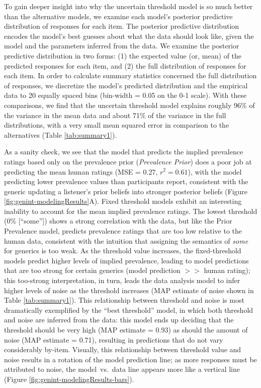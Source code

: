 \documentclass[floatsintext,doc]{apa6}
\begin{document}
To gain deeper insight into why the uncertain threshold model is so much better than the alternative models, we examine each model's posterior predictive distribution of responses for each item. The posterior predictive distribution encodes the model's best guesses about what the data should look like, given the model and the parameters inferred from the data. 
We examine the posterior predictive distribution in two forms: (1) the expected value (or, mean) of the predicted responses for each item, and (2) the full distribution of responses for each item. In order to calculate summary statistics concerned the full distribution of responses, we discretize the model's predicted distribution and the empirical data to 20 equally spaced bins (bin-width = 0.05 on the 0-1 scale). 
With these comparisons, we find that the uncertain threshold model explains roughly 96\% of the variance in the mean data and about 71\% of the variance in the full distributions, with a very small mean squared error in comparison to the alternatives (Table \ref{tab:summary1}). 

As a sanity check, we see that the model that predicts the implied prevalence ratings based only on the prevalence prior (\emph{Prevalence Prior}) does a poor job at predicting the mean human ratings (MSE = 0.27, $r^2 = 0.61$), with the model predicting lower prevalence values than participants report, consistent with the generic updating a listener's prior beliefs into stronger posterior beliefs (Figure \ref{fig:genint-modelingResults}A). 
Fixed threshold models exhibit an interesting inability to account for the mean implied prevalence ratings. The lowest threshold (0\% [``some'']) shows a strong correlation with the data, but like the Prior Prevalence model, predicts prevalence ratings that are too low relative to the human data, consistent with the intuition that assigning the semantics of \emph{some} for generics is too weak.
As the threshold value increases, the fixed-threshold models predict higher levels of implied prevalence, leading to model predictions that are too strong for certain generics (model prediction $>>$ human rating); this too-strong interpretation, in turn, leads the data analysis model to infer higher levels of noise as the threshold increases (MAP estimate of noise shown in Table \ref{tab:summary1}). 
This relationship between threshold and noise is most dramatically exemplified by the ``best threshold'' model, in which both threshold and noise are inferred from the data: this model ends up deciding that the threshold should be very high (MAP estimate = 0.93) as should the amount of noise (MAP estimate = 0.71), resulting in predictions that do not vary considerably by-item. 
Visually, this relationship between threshold value and noise results in a rotation of the model prediction line; as more responses must be attributed to noise, the model~vs.~data line appears more like a vertical line  (Figure \ref{fig:genint-modelingResults-bars}). 
\end{document}
